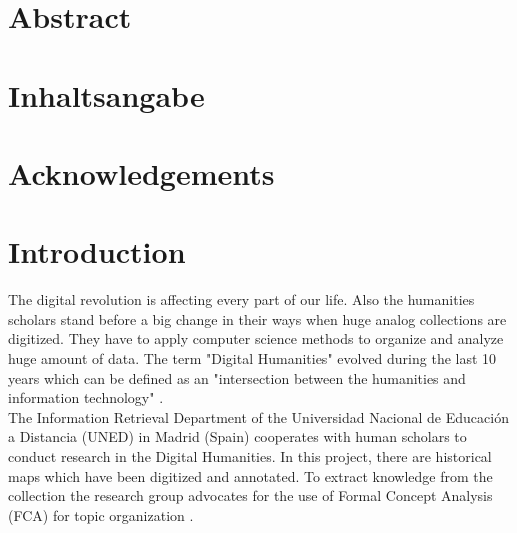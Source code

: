 \documentclass[11pt]{report}
\begin{document}


\renewcommand{\thepage}{\roman{page}}%

\newpage
\thispagestyle{empty}
\mbox{}

\chapter*{Abstract}
\blindtext

\newpage
\thispagestyle{empty}
\mbox{}

\chapter*{Inhaltsangabe}
\blindtext

\newpage
\thispagestyle{empty}
\mbox{}

\chapter*{Acknowledgements}
\blindtext

\newpage
\thispagestyle{empty}
\mbox{}

\tableofcontents
\newpage

\newpage
\thispagestyle{empty}
\mbox{}


\chapter{Introduction}

\renewcommand{\thepage}{\arabic{page}}
\setcounter{page}{1}

The digital revolution is affecting every part of our life. Also the humanities scholars stand before a big change in their ways when huge analog collections are digitized. They have to apply computer science methods to organize and analyze huge amount of data. The term "Digital Humanities" evolved during the last 10 years which can be defined as an "intersection between the humanities and information technology" \cite{Svensson2010}.\\

 The Information Retrieval Department of the Universidad Nacional de Educación a Distancia (UNED) in Madrid (Spain) cooperates with human scholars to conduct research in the Digital Humanities. In this project, there are historical maps which have been digitized and annotated. To extract knowledge from the collection the research group advocates for the use of Formal Concept Analysis (FCA) for topic organization \cite{Castellanos,Cigarran}.\\
 
\end{document}
